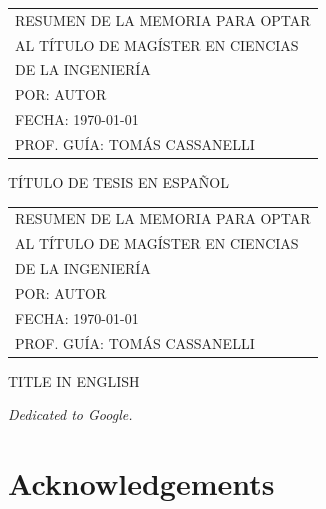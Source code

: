 \documentclass[
	12pt,
	letterpaper,
  oneside
  ]{book}
\makeatletter
\newenvironment{preliminary}%
  {\pagestyle{plain}\pagenumbering{roman}}%
  {\cleardoublepage\pagenumbering{arabic}}
\newenvironment{dedication}%
  {
  \if@openright\cleardoublepage\else\clearpage\fi
  \vspace*{\stretch{1}}
  \itshape
  \raggedleft
  \begingroup}%
  {\par\vspace{\stretch{3}}\endgroup\newpage}
\newenvironment{acknowledgements}%
  {\if@openright\cleardoublepage\else\clearpage\fi

  \chapter*{Acknowledgements}

   \begingroup}%
  {\par\endgroup\newpage}
\makeatother
\begin{document}
  \newpage
  
  \begin{preliminary}
  
  
  \setcounter{page}{2}

  \begin{tabular}{l}
		RESUMEN DE LA MEMORIA PARA OPTAR \\
		AL TÍTULO DE MAGÍSTER EN CIENCIAS \\
		DE LA INGENIERÍA \\
		POR: \MakeUppercase{Autor} \\
		FECHA: \MakeUppercase{\today} \\
		PROF. GUÍA: TOMÁS CASSANELLI
	\end{tabular}

  \begin{center}
    \MakeUppercase{Título de tesis en español}
  \end{center}
  \lipsum[1-2]

  \newpage

  \begin{tabular}{l}
		RESUMEN DE LA MEMORIA PARA OPTAR \\
		AL TÍTULO DE MAGÍSTER EN CIENCIAS \\
		DE LA INGENIERÍA \\
		POR: \MakeUppercase{Autor} \\
		FECHA: \MakeUppercase{\today} \\
		PROF. GUÍA: TOMÁS CASSANELLI
	\end{tabular}

  \begin{center}
    \MakeUppercase{Title in English}
  \end{center}
  \lipsum[1-2]

  \newpage

  \begin{dedication}
    Dedicated to Google.
  \end{dedication}

  \newpage

  \begin{acknowledgements}
    \lipsum[1-2]
  \end{acknowledgements}

  \tableofcontents

  \listoftables

  \listoffigures

\end{preliminary}
\end{document}
